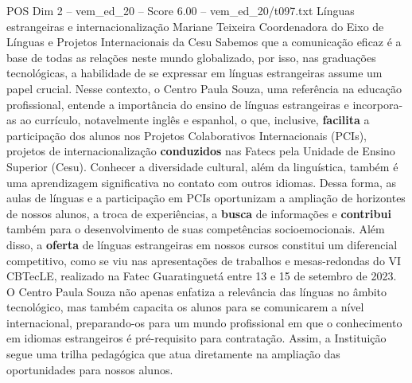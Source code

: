 \begin{textsample}{POS Dim 2 – vem\_ed\_20 – Score 6.00 – vem\_ed\_20/t097.txt}  \label{ex:f2_pos_099}
Línguas estrangeiras e internacionalização Mariane Teixeira Coordenadora do Eixo de Línguas e Projetos Internacionais da Cesu Sabemos que a comunicação eficaz é a base de todas as relações neste mundo globalizado, por isso, nas graduações tecnológicas, a habilidade de se expressar em línguas estrangeiras assume um papel crucial.
Nesse contexto, o Centro Paula Souza, uma referência na educação profissional, entende a importância do ensino de línguas estrangeiras e incorpora-as ao currículo, notavelmente inglês e espanhol, o que, inclusive, \textbf{facilita} a participação dos alunos nos Projetos Colaborativos Internacionais (PCIs), projetos de internacionalização \textbf{conduzidos} nas Fatecs pela Unidade de Ensino Superior (Cesu).
Conhecer a diversidade cultural, além da linguística, também é uma aprendizagem significativa no contato com outros idiomas.
Dessa forma, as aulas de línguas e a participação em PCIs oportunizam a ampliação de horizontes de nossos alunos, a troca de experiências, a \textbf{busca} de informações e \textbf{contribui} também para o desenvolvimento de suas competências socioemocionais.
Além disso, a \textbf{oferta} de línguas estrangeiras em nossos cursos constitui um diferencial competitivo, como se viu nas apresentações de trabalhos e mesas-redondas do VI CBTecLE, realizado na Fatec Guaratinguetá entre 13 e 15 de setembro de 2023.
O Centro Paula Souza não apenas enfatiza a relevância das línguas no âmbito tecnológico, mas também capacita os alunos para se comunicarem a nível internacional, preparando-os para um mundo profissional em que o conhecimento em idiomas estrangeiros é pré-requisito para contratação.
Assim, a Instituição segue uma trilha pedagógica que atua diretamente na ampliação das oportunidades para nossos alunos.

\end{textsample}
